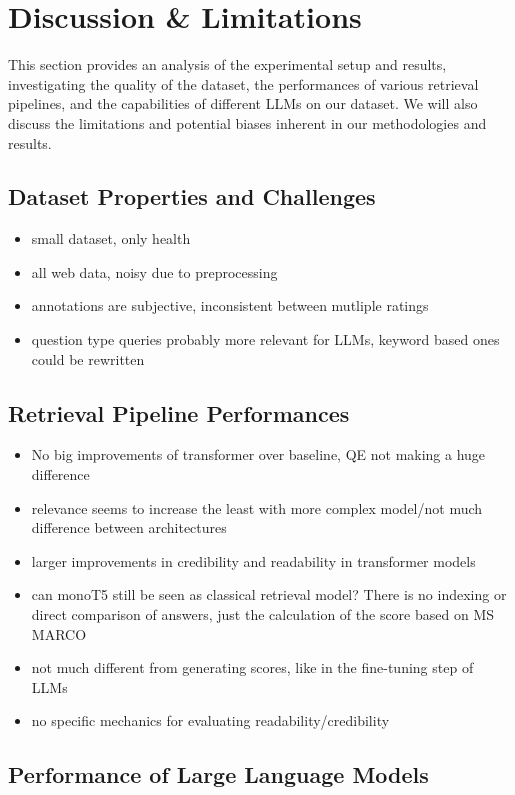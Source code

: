 \chapter{Discussion \& Limitations}

This section provides an analysis of the experimental setup and results, investigating the quality of the dataset, the performances of various retrieval pipelines, and the capabilities of different LLMs on our dataset.
We will also discuss the limitations and potential biases inherent in our methodologies and results.
\section{Dataset Properties and Challenges}
\begin{itemize}
    \item small dataset, only health
    \item all web data, noisy due to preprocessing
    \item annotations are subjective, inconsistent between mutliple ratings
    \item question type queries probably more relevant for LLMs, keyword based ones could be rewritten
\end{itemize}
\section{Retrieval Pipeline Performances}
\begin{itemize}
    \item No big improvements of transformer over baseline, QE not making a huge difference
    \item relevance seems to increase the least with more complex model/not much difference between architectures
    \item larger improvements in credibility and readability in transformer models
    \item can monoT5 still be seen as classical retrieval model? There is no indexing or direct comparison of answers, just the calculation of the score based on MS MARCO
    \item not much different from generating scores, like in the fine-tuning step of LLMs
    \item no specific mechanics for evaluating readability/credibility
\end{itemize}

\section{Performance of Large Language Models}

